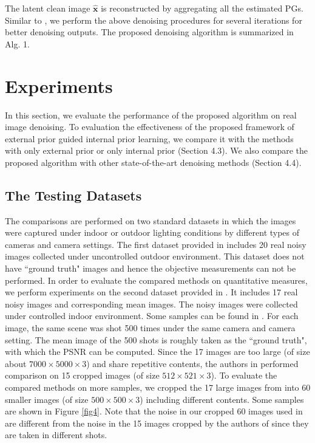 \documentclass[10pt,twocolumn,letterpaper]{article}
\begin{document}
The latent clean image $\hat{\mathbf{x}}$ is reconstructed by aggregating all the estimated PGs. Similar to \cite{pgpd}, we perform the above denoising procedures for several iterations for better denoising outputs. The proposed denoising algorithm is summarized in Alg. 1.


\section{Experiments}

In this section, we evaluate the performance of the proposed algorithm on real image denoising. To evaluation the effectiveness of the proposed framework of external prior guided internal prior learning, we compare it with the methods with only external prior or only internal prior (Section 4.3). We also compare the proposed algorithm with other state-of-the-art denoising methods \cite{bm3d,cbm3d,mlp,wnnm,csf,chen2015learning,crosschannel2016,noiseclinic,ncwebsite,neatimage} (Section 4.4).

\subsection{The Testing Datasets}

The comparisons are performed on two standard datasets in which the images were captured under indoor or outdoor lighting conditions by different types of cameras and camera settings. The first dataset provided in \cite{ncwebsite} includes 20 real noisy images collected under uncontrolled outdoor environment. This dataset does not have ``ground truth" images and hence the objective measurements can not be performed. In order to evaluate the compared methods on quantitative measures, we perform experiments on the second dataset provided in \cite{crosschannel2016}. It includes 17 real noisy images and corresponding mean images. The noisy images were collected under controlled indoor environment. Some samples can be found in \cite{crosschannel2016}. For each image, the same scene was shot 500 times under the same camera and camera setting. The mean image of the 500 shots is roughly taken as the ``ground truth", with which the PSNR can be computed. Since the 17 images are too large (of size about $7000\times5000\times3$) and share repetitive contents, the authors in \cite{crosschannel2016} performed comparison on 15 cropped images (of size $512\times 521\times3$). To evaluate the compared methods on more samples, we cropped the 17 large images from \cite{crosschannel2016} into 60 smaller images (of size $500\times 500\times3$) including different contents. Some samples are shown in Figure \ref{fig4}. Note that the noise in our cropped 60 images used in \cite{crosschannel2016} are different from the noise in the 15 images cropped by the authors of \cite{crosschannel2016} since they are taken in different shots.
\end{document}
